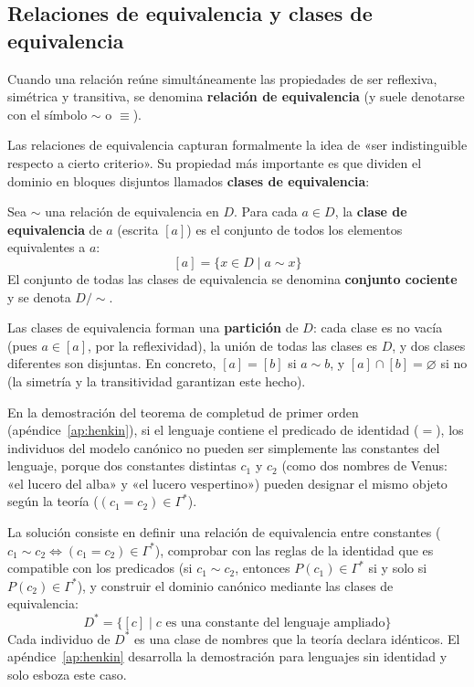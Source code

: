 \subsection{Relaciones de equivalencia y clases de equivalencia}
Cuando una relación reúne simultáneamente las propiedades de ser reflexiva, simétrica y transitiva, se denomina \textbf{relación de equivalencia} (y suele denotarse con el símbolo $\sim$ o $\equiv$).

Las relaciones de equivalencia capturan formalmente la idea de «ser indistinguible respecto a cierto criterio». Su propiedad más importante es que dividen el dominio en bloques disjuntos llamados \textbf{clases de equivalencia}:
\begin{definicion}
Sea $\sim$ una relación de equivalencia en $D$. Para cada $a \in D$, la \textbf{clase de equivalencia} de $a$ (escrita $[a]$) es el conjunto de todos los elementos equivalentes a $a$:
\[
[a] = \{x \in D \mid a \sim x\}
\]
El conjunto de todas las clases de equivalencia se denomina \textbf{conjunto cociente} y se denota $D / \sim$.
\end{definicion}
Las clases de equivalencia forman una \textbf{partición} de $D$: cada clase es no vacía (pues $a \in [a]$, por la reflexividad), la unión de todas las clases es $D$, y dos clases diferentes son disjuntas. En concreto, $[a] = [b]$ si $a \sim b$, y $[a] \cap [b] = \varnothing$ si no (la simetría y la transitividad garantizan este hecho).

\begin{aplicacion}
En la demostración del teorema de completud de primer orden (apéndice~\ref{ap:henkin}), si el lenguaje contiene el predicado de identidad ($=$), los
individuos del modelo canónico no pueden ser simplemente las constantes
del lenguaje, porque dos constantes distintas $c_1$ y $c_2$
(como dos nombres de Venus: «el lucero del alba» y «el lucero vespertino»)
pueden designar el mismo objeto según la teoría ($(c_1 = c_2) \in \Gamma^*$). 

La solución consiste en definir una relación de equivalencia entre constantes ($c_1 \sim c_2 \iff (c_1 = c_2) \in \Gamma^*$), comprobar con las reglas de la identidad que es compatible con los predicados (si $c_1 \sim c_2$, entonces $P(c_1) \in \Gamma^*$ si y solo si $P(c_2) \in \Gamma^*$), y construir el dominio canónico mediante las clases de equivalencia:
\[
D^* = \{[c] \mid c \text{ es una constante del lenguaje ampliado}\}
\]
Cada individuo de $D^*$ es una clase de nombres que la teoría declara idénticos. El apéndice~\ref{ap:henkin} desarrolla la demostración para lenguajes sin identidad y solo esboza este caso.
\end{aplicacion}

